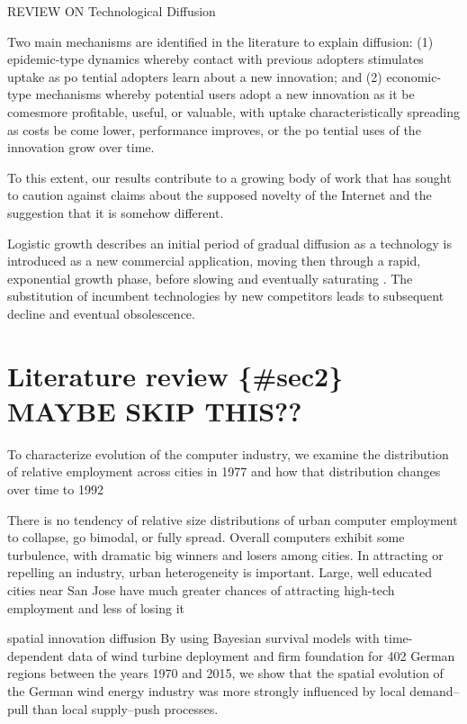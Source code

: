 \documentclass[
  authoryear,
  preprint,
  3p]{elsarticle}
\begin{document}
\citet{ding2010modeling} REVIEW ON Technological Diffusion

\citet{perkins2011internet} Two main mechanisms are identified in the
literature to explain diffusion: (1) epidemic-type dynamics whereby
contact with previous adopters stimulates uptake as po tential adopters
learn about a new innovation; and (2) economic-type mechanisms whereby
potential users adopt a new innovation as it be comesmore profitable,
useful, or valuable, with uptake characteristically spreading as costs
be come lower, performance improves, or the po tential uses of the
innovation grow over time.

To this extent, our results contribute to a growing body of work that
has sought to caution against claims about the supposed novelty of the
Internet and the suggestion that it is somehow different.

\citet{wilson201281} Logistic growth describes an initial period of
gradual diffusion as a technology is introduced as a new commercial
application, moving then through a rapid, exponential growth phase,
before slowing and eventually saturating \citep{grubler1999dynamics}.
The substitution of incumbent technologies by new competitors leads to
subsequent decline and eventual obsolescence.

\hypertarget{literature-review-sec2-maybe-skip-this}{%
\section{Literature review \{\#sec2\} MAYBE SKIP
THIS??}\label{literature-review-sec2-maybe-skip-this}}

\citet{beardsell1999spatial} To characterize evolution of the computer
industry, we examine the distribution of relative employment across
cities in 1977 and how that distribution changes over time to 1992

There is no tendency of relative size distributions of urban computer
employment to collapse, go bimodal, or fully spread. Overall computers
exhibit some turbulence, with dramatic big winners and losers among
cities. In attracting or repelling an industry, urban heterogeneity is
important. Large, well educated cities near San Jose have much greater
chances of attracting high-tech employment and less of losing it

\citet{bednarz2020pulled} spatial innovation diffusion By using Bayesian
survival models with time-dependent data of wind turbine deployment and
firm foundation for 402 German regions between the years 1970 and 2015,
we show that the spatial evolution of the German wind energy industry
was more strongly influenced by local demand-- pull than local
supply--push processes.
\end{document}
